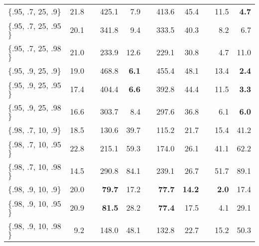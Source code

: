 \documentclass[ba]{imsart}
\numberwithin{equation}{section}
\theoremstyle{plain}
\begin{document}
\begin{table}[!t]
{\begin{tabular}{lrlrrlrrlrr}
\hline
$\{$.95, .7, 25, .9$\}$  & 21.8  &   & {\color{black} 425.1}       & 7.9         &   & {\color{black} 413.6}      & {\color{black} 45.4}        &   & 11.5       & \textbf{ 4.7}         \\
$\{$.95, .7, 25, .95$\}$ & 20.1  &   & {\color{black} 341.8}       & 9.4         &   & {\color{black} 333.5}      & {\color{black} 40.3}        &   & 8.2       & 6.7         \\
$\{$.95, .7, 25, .98$\}$ & 21.0  &   & 233.9       & 12.6        &   & 229.1      & 30.8        &   & 4.7       & 11.0        \\
$\{$.95, .9, 25, .9$\}$  & 19.0  &   & {\color{black} 468.8}       & \textbf{ 6.1}         &   & {\color{black} 455.4}      & {\color{black} 48.1}        &   & {\color{black} 13.4}       & \textbf{ 2.4}         \\
$\{$.95, .9, 25, .95$\}$ & 17.4  &   & {\color{black} 404.4}       & \textbf{ 6.6}         &   & {\color{black} 392.8}      & {\color{black} 44.4}        &   & 11.5       & \textbf{ 3.3}         \\
$\{$.95, .9, 25, .98$\}$ & 16.6  &   & {\color{black} 303.7}       & 8.4         &   & {\color{black} 297.6}      & {\color{black} 36.8}        &   & 6.1       & \textbf{ 6.0}         \\
\hline
$\{$.98, .7, 10, .9$\}$  & 18.5  &   & 130.6       & {\color{black} 39.7}        &   & 115.2      & 21.7        &   & {\color{black} 15.4}       & {\color{black} 41.2}       \\
$\{$.98, .7, 10, .95$\}$ & 22.8  &   & 215.1       & {\color{black} 59.3}        &   & 174.0      & 26.1        &   & {\color{black} 41.1}       & {\color{black} 62.2}        \\
$\{$.98, .7, 10, .98$\}$ & 14.5  &   & 290.8       & {\color{black} 84.1}        &   & 239.1      & 26.7        &   & {\color{black} 51.7}       & {\color{black} 89.1}        \\
$\{$.98, .9, 10, .9$\}$  & 20.0  &   & \textbf{ 79.7}       & 17.2        &   & \textbf{ 77.7}      & \textbf{ 14.2}        &   & \textbf{ 2.0}       & 17.4        \\
$\{$.98, .9, 10, .95$\}$ & 20.9  &   & \textbf{ 81.5}       & 28.2        &   & \textbf{ 77.4}      & 17.5        &   & 4.1       & 29.1        \\
$\{$.98, .9, 10, .98$\}$ & 9.2   &   & 148.0       & {\color{black} 48.1}        &   & 132.8      & 22.7        &   & {\color{black} 15.2}       & {\color{black} 50.3}        \\

\end{tabular}}
\end{table}
\end{document}
